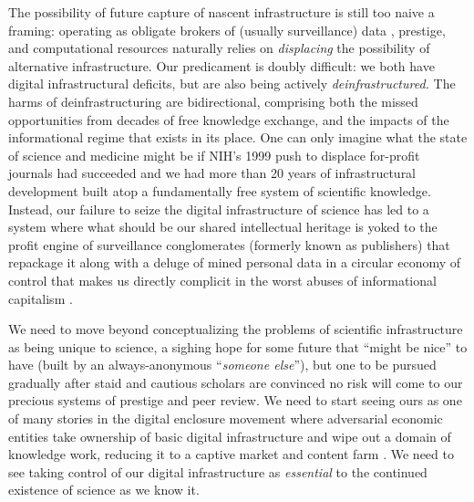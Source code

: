 The possibility of future capture of nascent infrastructure is still too
naive a framing: operating as obligate brokers of (usually surveillance)
data\citep{pooleySurveillancePublishing2021, zuboffBigOtherSurveillance2015, warkCapitalDeadThis2021} , prestige,
and computational resources naturally relies on \emph{displacing} the
possibility of alternative infrastructure. Our predicament is doubly
difficult: we both have digital infrastructural deficits, but are also
being actively \emph{deinfrastructured.} The harms of deinfrastructuring
are bidirectional, comprising both the missed opportunities from decades
of free knowledge exchange, and the impacts of the informational regime
that exists in its place. One can only imagine what the state of science
and medicine might be if NIH's 1999 push to displace for-profit
journals\citep{robertsBuildingGenBankPublished2001, varmusArtPoliticsScience2009, klingRealStakesVirtual2004, markovitzBiomedicineElectronicPublishing2000}  had succeeded and we
had more than 20 years of infrastructural development built atop a
fundamentally free system of scientific knowledge. Instead, our failure
to seize the digital infrastructure of science has led to a system where
what should be our shared intellectual heritage is yoked to the profit
engine of surveillance conglomerates (formerly known as publishers) \citep{pooleySurveillancePublishing2021, franceschi-bicchieraiAcademicJournalClaims2022}  that repackage it
along with a deluge of mined personal data in a circular economy of
control \citep{brembsAlgorithmicEmploymentDecisions2021, appleWatchOSDeliversNew2022, douressProfessionalMatchingService2007} 
that makes us directly complicit in the worst abuses of informational
capitalism \citep{biddleICESearchedLexisNexis2022, biddleLexisNexisProvideGiant2021, lamdanDefundPoliceDefund2020, lamdanLibrarianshipCrossroadsICE2019, westDataCapitalismRedefining2019} .

We need to move beyond conceptualizing the problems of scientific
infrastructure as being unique to science, a sighing hope for some
future that ``might be nice'' to have (built by an always-anonymous
``\emph{someone else}''), but one to be pursued gradually after staid
and cautious scholars are convinced no risk will come to our precious
systems of prestige and peer review. We need to start seeing ours as one
of many stories in the digital enclosure movement where adversarial
economic entities take ownership of basic digital infrastructure and
wipe out a domain of knowledge work, reducing it to a captive market and
content farm \citep{warkCapitalDeadThis2021, warkHackerManifesto2004} . We need to see taking control of our digital infrastructure as
\emph{essential} to the continued existence of science as we know it.

